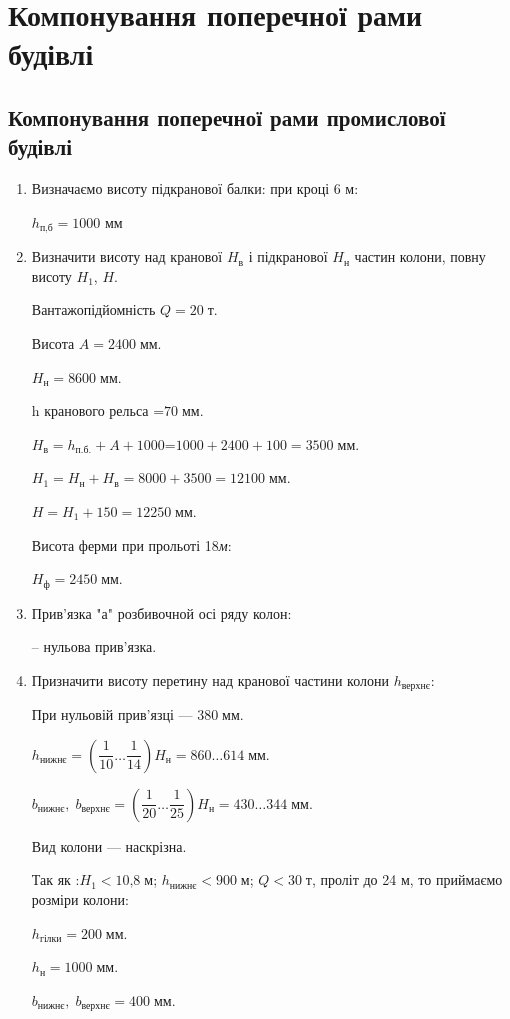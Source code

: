 \documentclass[a4paper,14pt]{article}
\author{}
\title{}
\date{\today}
\begin{document}
\section{Компонування поперечної рами будівлі}
\subsection{Компонування поперечної рами промислової будівлі}
\begin{enumerate}
\item Визначаємо висоту підкранової балки: при кроці 6 м:

$h_{\textit{п,б}}=1000$ мм

\item Визначити висоту над кранової $H_{\textit{в}}$ і підкранової $H_{\textit{н}}$ частин колони, повну висоту $H_{\textit{1}}$, $H$.

Вантажопідйомність $Q= 20\;{\textit{т}}$.

Висота $A=2400\;{\textit{мм}}$.

$H_{\textit{н}}=8600\;{\textit{мм}}$.

h кранового рельса =$70\;{\textit{мм}}$.

$H_{\textit{в}}=h_{\textit{п.б.}}+A+1000$=$1000+2400+100=3500\;\textit{мм}$.

$H_1=H_{\textit{н}}+H_{\textit{в}}=8000+3500=12100\;\textit{мм}$.

$H=H_1+150=12250\;\textit{мм}$.

Висота ферми при прольоті 18\;\textit{м}\;:

$H_{\textit{ф}}=2450\;\textit{мм}$.

\item Прив'язка "а" розбивочной осі ряду колон:

-- нульова прив'язка.

\item Призначити висоту перетину над кранової частини колони $h_{\textit{верхнє}}$:

При нульовій прив'язці --- $380\;{\textit{мм}}$.

$h_{\textit{нижнє}}=\left(\dfrac{1}{10}\ldots\dfrac{1}{14}\right)H_\textit{н}=860\ldots614\;\textit{мм}$.

$b_{\textit{нижнє}},\;b_{\textit{верхнє}}=\left(\dfrac{1}{20}\ldots\dfrac{1}{25}\right)H_\textit{н}=430\ldots344\;\textit{мм}$.

Вид колони --- наскрізна.

Так як :$H_1<\textit{10,8}\;\textit{м}$; $h_\textit{нижнє}<\textit{900}\;\textit{м}$; $Q<\textit{30}\;\textit{т}$, проліт до 24 м, то приймаємо розміри колони:

$h_{\textit{гілки}}=200\;\textit{мм}$.

$h_{\textit{н}}=1000\;\textit{мм}$.

$b_{\textit{нижнє}},\;b_{\textit{верхнє}}=400\;\textit{мм}$.
\end{enumerate}
\newpage
\end{document}
